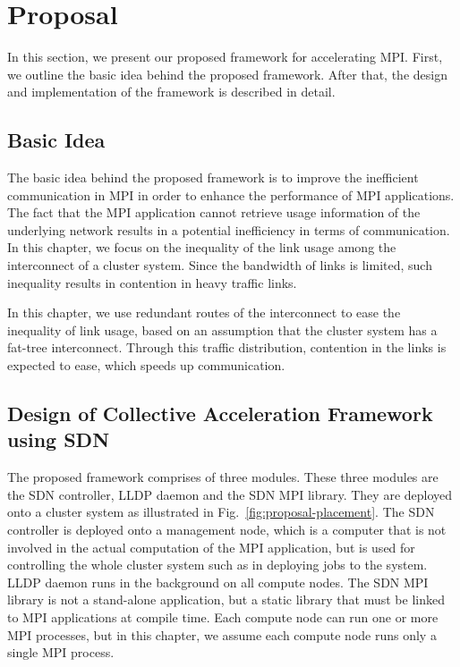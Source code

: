 \section{Proposal}\label{sec:iii-proposal}

In this section, we present our proposed framework for accelerating MPI\@.
First, we outline the basic idea behind the proposed framework. After that,
the design and implementation of the framework is described in detail.

\subsection{Basic Idea}

The basic idea behind the proposed framework is to improve the
inefficient communication in MPI in order to enhance the performance of
MPI applications. The fact that the MPI application cannot retrieve
usage information of the underlying network results in a potential
inefficiency in terms of communication. In this chapter, we focus on the
inequality of the link usage among the interconnect of a cluster system. Since
the bandwidth of links is limited, such inequality results in contention in
heavy traffic links.

In this chapter, we use redundant routes of the interconnect to ease the
inequality of link usage, based on an assumption that the cluster system has a
fat-tree interconnect. Through this traffic distribution, contention in the
links is expected to ease, which speeds up communication.

\subsection{Design of Collective Acceleration Framework using SDN}

The proposed framework comprises of three modules. These three modules are
the SDN controller, LLDP daemon and the SDN MPI library. They are
deployed onto a cluster system as illustrated in
Fig.~\ref{fig:proposal-placement}. The SDN controller is deployed onto a
management node, which is a computer that is not involved in the actual
computation of the MPI application, but is used for controlling the whole
cluster system such as in deploying jobs to the system. LLDP daemon runs in
the background on all compute nodes. The SDN MPI library is not a
stand-alone application, but a static library that must be linked to MPI
applications at compile time. Each compute node can run one or more MPI
processes, but in this chapter, we assume each compute node runs only a
single MPI process.

